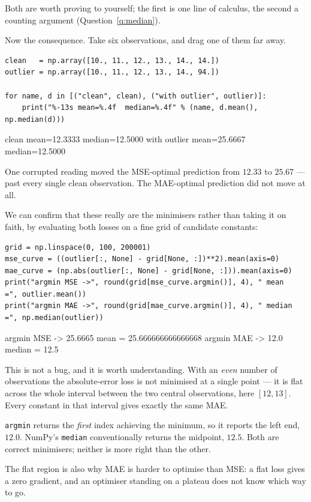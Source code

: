 \documentclass[11pt]{article}
\begin{document}
Both are worth proving to yourself; the first is one line of calculus, the
second a counting argument (Question~\ref{q:median}).

Now the consequence. Take six observations, and drag one of them far away.

\begin{lstlisting}
clean   = np.array([10., 11., 12., 13., 14., 14.])
outlier = np.array([10., 11., 12., 13., 14., 94.])

for name, d in [("clean", clean), ("with outlier", outlier)]:
    print("%-13s mean=%.4f  median=%.4f" % (name, d.mean(), np.median(d)))
\end{lstlisting}
\begin{codeout}
clean         mean=12.3333  median=12.5000
with outlier  mean=25.6667  median=12.5000
\end{codeout}

One corrupted reading moved the MSE-optimal prediction from $12.33$ to
$\mathbf{25.67}$ --- past every single clean observation. The MAE-optimal
prediction did not move at all.

We can confirm that these really are the minimisers rather than taking it on
faith, by evaluating both losses on a fine grid of candidate constants:

\begin{lstlisting}
grid = np.linspace(0, 100, 200001)
mse_curve = ((outlier[:, None] - grid[None, :])**2).mean(axis=0)
mae_curve = (np.abs(outlier[:, None] - grid[None, :])).mean(axis=0)
print("argmin MSE ->", round(grid[mse_curve.argmin()], 4), " mean   =", outlier.mean())
print("argmin MAE ->", round(grid[mae_curve.argmin()], 4), " median =", np.median(outlier))
\end{lstlisting}
\begin{codeout}
argmin MSE -> 25.6665  mean   = 25.666666666666668
argmin MAE -> 12.0  median = 12.5
\end{codeout}

\begin{caution}
This is not a bug, and it is worth understanding. With an \emph{even} number of
observations the absolute-error loss is not minimised at a single point --- it
is flat across the whole interval between the two central observations, here
$[12, 13]$. Every constant in that interval gives exactly the same MAE.

\texttt{argmin} returns the \emph{first} index achieving the minimum, so it
reports the left end, $12.0$. NumPy's \texttt{median} conventionally returns the
midpoint, $12.5$. Both are correct minimisers; neither is more right than the
other.

The flat region is also why MAE is harder to optimise than MSE: a flat loss
gives a zero gradient, and an optimiser standing on a plateau does not know
which way to go.
\end{caution}
\end{document}
